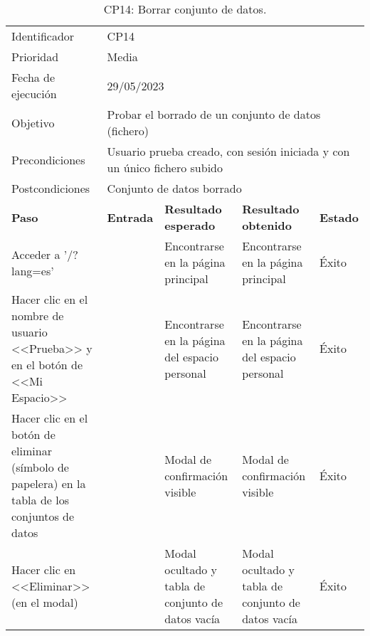 \begin{table}[H]
\begin{tabular}{p{}p{}p{}p{}p{}}
\rowcolor{gray!25}
Identificador   & \multicolumn{4}{l}{CP14}                                                   \\
Prioridad   & \multicolumn{4}{l}{Media}                                                    \\
\rowcolor{gray!25}
Fecha de ejecución   & \multicolumn{4}{l}{29/05/2023}                                                    \\
Objetivo        & \multicolumn{4}{p{0.80\textwidth}}{Probar el borrado de un conjunto de datos (fichero)}                                                     \\
\rowcolor{gray!25}
Precondiciones  & \multicolumn{4}{p{0.80\textwidth}}{Usuario prueba creado, con sesión iniciada y con un único fichero subido}                                                     \\
Postcondiciones & \multicolumn{4}{l}{Conjunto de datos borrado}                                                     \\ \hline
\rowcolor{gray!25}
\textbf{Paso}   & \textbf{Entrada} & \textbf{Resultado esperado} & \textbf{Resultado obtenido} & \textbf{Estado} \\ \hline
Acceder a '/?lang=es'                                 &                        & Encontrarse en la página principal                                   & Encontrarse en la página principal                           & Éxito  \\ \hline
Hacer clic en el nombre de usuario <<Prueba>> y en el botón de <<Mi Espacio>>  &     & Encontrarse en la página del espacio personal                  & Encontrarse en la página del espacio personal                       & Éxito  \\ \hline 
Hacer clic en el botón de eliminar (símbolo de papelera) en la tabla de los conjuntos de datos &                     & Modal de confirmación visible                                     & Modal de confirmación visible                     & Éxito                            \\ \hline
Hacer clic en <<Eliminar>> (en el modal)              &                        & Modal ocultado y tabla de conjunto de datos vacía                    & Modal ocultado y tabla de conjunto de datos vacía            & Éxito                            \\ \hline
\end{tabular}
\caption{CP14: Borrar conjunto de datos.}
\end{table}

